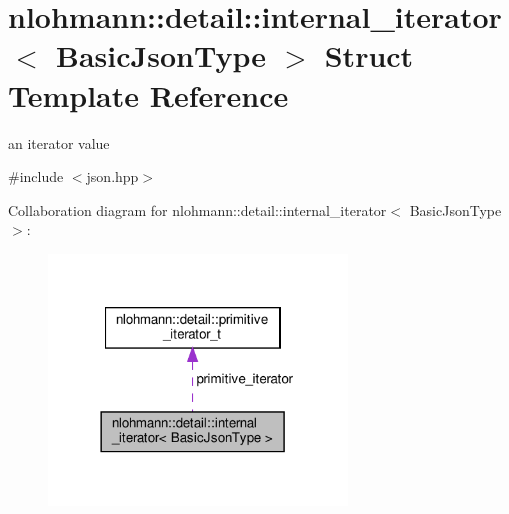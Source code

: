 \hypertarget{structnlohmann_1_1detail_1_1internal__iterator}{}\section{nlohmann\+:\+:detail\+:\+:internal\+\_\+iterator$<$ Basic\+Json\+Type $>$ Struct Template Reference}
\label{structnlohmann_1_1detail_1_1internal__iterator}


an iterator value  




{\ttfamily \#include $<$json.\+hpp$>$}



Collaboration diagram for nlohmann\+:\+:detail\+:\+:internal\+\_\+iterator$<$ Basic\+Json\+Type $>$\+:
\nopagebreak
\begin{figure}[H]
\begin{center}
\leavevmode
\includegraphics[width=225pt]{structnlohmann_1_1detail_1_1internal__iterator__coll__graph}
\end{center}
\end{figure}
